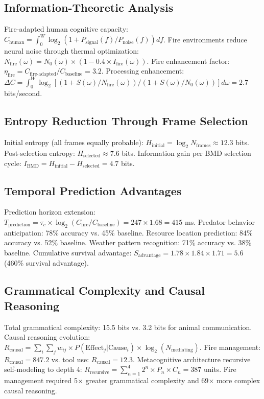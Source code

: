 \documentclass[12pt,a4paper]{article}
\begin{document}
\subsection{Information-Theoretic Analysis}

Fire-adapted human cognitive capacity: $C_{\text{human}} = \int_0^W \log_2(1 + P_{\text{signal}}(f)/P_{\text{noise}}(f)) df$. Fire environments reduce neural noise through thermal optimization: $N_{\text{fire}}(\omega) = N_0(\omega) \times (1 - 0.4 \times I_{\text{fire}}(\omega))$. Fire enhancement factor: $\eta_{\text{fire}} = C_{\text{fire-adapted}}/C_{\text{baseline}} = 3.2$. Processing enhancement: $\Delta C = \int_0^W \log_2[(1 + S(\omega)/N_{\text{fire}}(\omega))/(1 + S(\omega)/N_0(\omega))] d\omega = 2.7$ bits/second.

\subsection{Entropy Reduction Through Frame Selection}

Initial entropy (all frames equally probable): $H_{\text{initial}} = \log_2 N_{\text{frames}} \approx 12.3$ bits. Post-selection entropy: $H_{\text{selected}} \approx 7.6$ bits. Information gain per BMD selection cycle: $I_{\text{BMD}} = H_{\text{initial}} - H_{\text{selected}} = 4.7$ bits.

\subsection{Temporal Prediction Advantages}

Prediction horizon extension: $T_{\text{prediction}} = \tau_c \times \log_2(C_{\text{fire}}/C_{\text{baseline}}) = 247 \times 1.68 = 415$ ms. Predator behavior anticipation: 78\% accuracy vs. 45\% baseline. Resource location prediction: 84\% accuracy vs. 52\% baseline. Weather pattern recognition: 71\% accuracy vs. 38\% baseline. Cumulative survival advantage: $S_{\text{advantage}} = 1.78 \times 1.84 \times 1.71 = 5.6$ (460\% survival advantage).

\subsection{Grammatical Complexity and Causal Reasoning}

Total grammatical complexity: 15.5 bits vs. 3.2 bits for animal communication. Causal reasoning evolution: $R_{\text{causal}} = \sum_i \sum_j w_{ij} \times P(\text{Effect}_j | \text{Cause}_i) \times \log_2(N_{\text{mediating}})$. Fire management: $R_{\text{causal}} = 847.2$ vs. tool use: $R_{\text{causal}} = 12.3$. Metacognitive architecture recursive self-modeling to depth 4: $R_{\text{recursive}} = \sum_{n=1}^4 2^n \times P_n \times C_n = 387$ units. Fire management required 5$\times$ greater grammatical complexity and 69$\times$ more complex causal reasoning.
\end{document}
